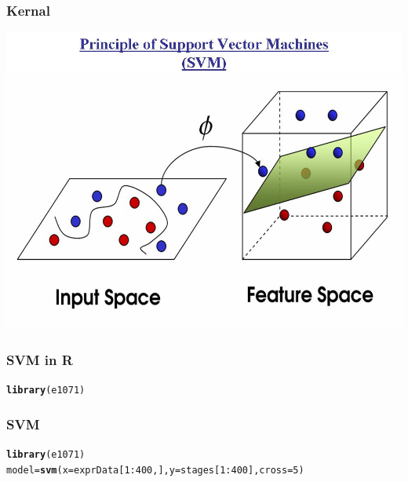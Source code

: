 \documentclass[UTF8]{beamer}\usepackage[]{graphicx}\usepackage[]{color}
\makeatletter
\newcommand{\hlnum}[1]{\textcolor[rgb]{0.686,0.059,0.569}{#1}}%
\newcommand{\hlopt}[1]{\textcolor[rgb]{0,0,0}{#1}}%
\newcommand{\hlstd}[1]{\textcolor[rgb]{0.345,0.345,0.345}{#1}}%
\newcommand{\hlkwb}[1]{\textcolor[rgb]{0.69,0.353,0.396}{#1}}%
\newcommand{\hlkwc}[1]{\textcolor[rgb]{0.333,0.667,0.333}{#1}}%
\newcommand{\hlkwd}[1]{\textcolor[rgb]{0.737,0.353,0.396}{\textbf{#1}}}%
\newenvironment{kframe}{%
 \def\at@end@of@kframe{}%
 \ifinner\ifhmode%
  \def\at@end@of@kframe{\end{minipage}}%
  \begin{minipage}{\columnwidth}%
 \fi\fi%
 \def\FrameCommand##1{\hskip\@totalleftmargin \hskip-\fboxsep
 \colorbox{shadecolor}{##1}\hskip-\fboxsep
     \hskip-\linewidth \hskip-\@totalleftmargin \hskip\columnwidth}%
 \MakeFramed {\advance\hsize-\width
   \@totalleftmargin\z@ \linewidth\hsize
   \@setminipage}}%
 {\par\unskip\endMakeFramed%
 \at@end@of@kframe}
\newenvironment{knitrout}{}{} %
\makeatother
\begin{document}
\begin{frame}
  \frametitle{Kernal}
\centerline{\includegraphics[height=.7\textheight]{kernel.jpg}}
\end{frame}


\begin{frame}[fragile]
  \frametitle{SVM in R}




\begin{knitrout}
\color{fgcolor}\begin{kframe}
\begin{alltt}
 \hlkwd{library}\hlstd{(e1071)}
\end{alltt}
\end{kframe}
\end{knitrout}

\end{frame}

\begin{frame}[fragile]
  \frametitle{SVM}

\begin{knitrout}
\color{fgcolor}\begin{kframe}
\begin{alltt}
 \hlkwd{library}\hlstd{(e1071)}
 \hlstd{model} \hlkwb{=} \hlkwd{svm}\hlstd{(}\hlkwc{x} \hlstd{= exprData[}\hlnum{1}\hlopt{:}\hlnum{400}\hlstd{,],} \hlkwc{y} \hlstd{= stages[}\hlnum{1}\hlopt{:}\hlnum{400}\hlstd{],} \hlkwc{cross}\hlstd{=}\hlnum{5}\hlstd{)}
\end{alltt}
\end{kframe}
\end{knitrout}
\end{frame}
\end{document}
